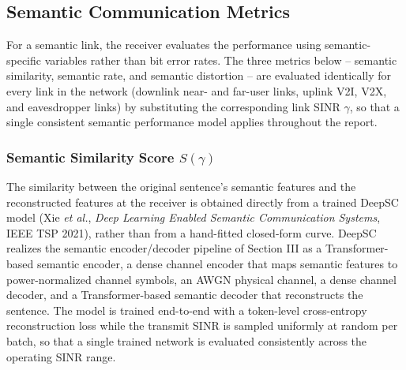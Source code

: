\documentclass[journal,onecolumn]{IEEEtran}
\begin{document}
\subsection{Semantic Communication Metrics}
For a semantic link, the receiver evaluates the performance using semantic-specific variables rather than bit error rates. The three metrics below -- semantic similarity, semantic rate, and semantic distortion -- are evaluated identically for every link in the network (downlink near- and far-user links, uplink V2I, V2X, and eavesdropper links) by substituting the corresponding link SINR $\gamma$, so that a single consistent semantic performance model applies throughout the report.

\subsubsection{Semantic Similarity Score $S(\gamma)$}
The similarity between the original sentence's semantic features and the reconstructed features at the receiver is obtained directly from a trained DeepSC model (Xie \emph{et al.}, \emph{Deep Learning Enabled Semantic Communication Systems}, IEEE TSP 2021), rather than from a hand-fitted closed-form curve. DeepSC realizes the semantic encoder/decoder pipeline of Section III as a Transformer-based semantic encoder, a dense channel encoder that maps semantic features to power-normalized channel symbols, an AWGN physical channel, a dense channel decoder, and a Transformer-based semantic decoder that reconstructs the sentence. The model is trained end-to-end with a token-level cross-entropy reconstruction loss while the transmit SINR is sampled uniformly at random per batch, so that a single trained network is evaluated consistently across the operating SINR range.
\end{document}
